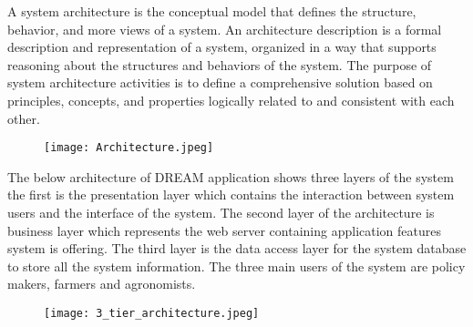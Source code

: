 \documentclass[../../main.tex]{subfiles}
\begin{document}
A system architecture is the conceptual model that defines the structure, behavior, and more views of a system. An architecture description is a formal description and representation of a system, organized in a way that supports reasoning about the structures and behaviors of the system. The purpose of system architecture activities is to define a comprehensive solution based on principles, concepts, and properties logically related to and consistent with each other.

\begin{figure}[H]
    \centering
    \texttt{[image: Architecture.jpeg]}
\end{figure}

The below architecture of DREAM application shows three layers of the system the first is the presentation layer which contains the interaction between system users and the interface of the system. The second layer of the architecture is business layer which represents the web server containing application features system is offering. The third layer is the data access layer for the system database to store all the system information. The three main users of the system are policy makers, farmers and agronomists. 


\begin{figure}[H]
    \centering
    \texttt{[image: 3\_tier\_architecture.jpeg]}

\end{figure}
\end{document}
